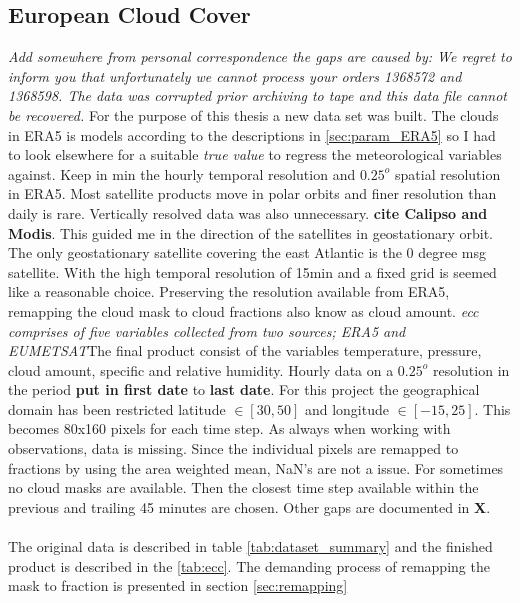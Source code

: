 \subsection{European Cloud Cover} \label{sec:ECC}
\textit{Add somewhere from personal correspondence the gaps are caused by: We regret to inform you that unfortunately we cannot process your orders 1368572 and 1368598. The data was corrupted prior archiving to tape and this data file cannot be recovered. }
For the purpose of this thesis a new data set was built. The clouds in ERA5 is models according to the descriptions in \ref{sec:param_ERA5} so I had to look elsewhere for a suitable \textit{true value} to regress the meteorological variables against. Keep in min the hourly temporal resolution and $0.25^o$ spatial resolution in ERA5. Most satellite products move in polar orbits and finer resolution than daily is rare. Vertically resolved data was also unnecessary. \textbf{cite Calipso and Modis}. This guided me in the direction of the satellites in geostationary orbit. The only geostationary satellite covering the east Atlantic is the 0 degree \acrfull{msg} satellite. With the high temporal resolution of 15min and a fixed grid is seemed like a reasonable choice. %
Preserving the resolution available from ERA5, remapping the cloud mask to cloud fractions also know as cloud amount. \textit{\acrshort{ecc} comprises of five variables collected from two sources; ERA5 and EUMETSAT}The final product consist of the variables temperature, pressure, cloud amount, specific and relative humidity. Hourly data on a $0.25^o$ resolution in the period \textbf{put in first date} to \textbf{last date}. 
For this project the geographical domain has been restricted latitude $\in[30,50]$ and longitude $\in [-15, 25]$. This becomes 80x160 pixels for each time step. As always when working with observations, data is missing. Since the individual pixels are remapped to fractions by using the area weighted mean, NaN's are not a issue. For sometimes no cloud masks are available. Then the closest time step available within the previous and trailing 45 minutes are chosen. Other gaps are documented in \textbf{X}. 
\\ \\
The original data is described in table \ref{tab:dataset_summary} and the finished product is described in the \ref{tab:ecc}. The demanding process of remapping the mask to fraction is presented in section \ref{sec:remapping}
